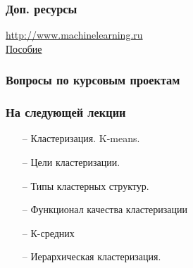 \documentclass[12pt]{beamer}
\begin{document}








\begin{frame}\frametitle{Доп. ресурсы}

\href{http://www.machinelearning.ru}{http://www.machinelearning.ru}\\
\vspace{8mm}
\href{http://www.machinelearning.ru/wiki/images/6/6d/Voron-ML-1.pdf}{Пособие}

\end{frame}

\begin{frame}\frametitle{Вопросы по курсовым проектам}

\end{frame}

\begin{frame}\frametitle{На следующей лекции}
\begin{itemize}
\item[--] Кластеризация.  K-means.
\item[--] Цели кластеризации.
\item[--] Типы кластерных структур.
\item[--] Функционал качества кластеризации
\item[--] К-средних
\item[--] Иерархическая кластеризация.
\end{itemize}
\end{frame}
\end{document}
